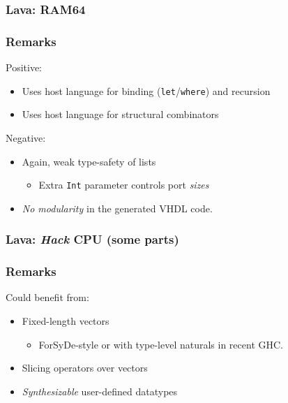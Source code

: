         \begin{frame}
            \frametitle{Lava: RAM64}
        \end{frame}

        \begin{frame}
            \frametitle{Remarks}

            \par{Positive:}
            \begin{itemize}
                \item Uses host language for binding (\texttt{let}/\texttt{where}) and recursion
                \item Uses host language for structural combinators
            \end{itemize}

            \par{Negative:}
            \begin{itemize}
                \item Again, weak type-safety of lists
                    \begin{itemize}
                        \item Extra \texttt{Int} parameter controls port \emph{sizes}
                    \end{itemize}
                \item \emph{No modularity} in the generated VHDL code.
            \end{itemize}
        \end{frame}

        \begin{frame}
            \frametitle{Lava: \emph{Hack} CPU (some parts)}
        \end{frame}

        \begin{frame}
            \frametitle{Remarks}

            \par{Could benefit from:}
            \begin{itemize}
                \item Fixed-length vectors
                    \begin{itemize}
                        \item ForSyDe-style or with type-level naturals in recent GHC.
                    \end{itemize}
                \item Slicing operators over vectors
                \item \emph{Synthesizable} user-defined datatypes
            \end{itemize}
        \end{frame}


